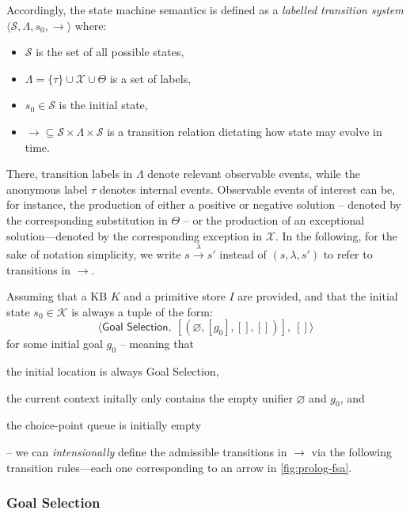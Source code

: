 \documentclass{article}
\newenvironment{inlinelist}{\begin{enumerate*}[label=\emph{(\roman*)}]}{\end{enumerate*}}
\newcommand{\stateStyle}[1]{\textsf{#1}}
\newcommand{\state}[1]{\stateStyle{#1}}
\newcommand{\notableset}[1]{\mathcal{#1}}
\newcommand{\transition}[1]{\xrightarrow{\ #1\ }}
\begin{document}
Accordingly, the state machine semantics is defined as a \emph{labelled transition system} $\langle \notableset{S}, \Lambda, s_0, \longrightarrow \rangle$ where:
%
\begin{itemize}
    \item $\notableset{S}$ is the set of all possible states,
    \item $\Lambda = \{ \tau \} \cup \notableset{X} \cup \Theta $ is a set of labels,
    \item $s_0 \in \notableset{S}$ is the initial state,
    \item $\longrightarrow \subseteq \notableset{S} \times \Lambda \times \notableset{S}$ is a transition relation dictating how state may evolve in time.
\end{itemize}
%
There, transition labels in $\Lambda$ denote relevant observable events, while the anonymous label $\tau$ denotes internal events.
%
Observable events of interest can be, for instance, the production of either a positive or negative solution -- denoted by the corresponding substitution in $\Theta$ -- or the production of an exceptional solution---denoted by the corresponding exception in $\notableset{X}$.
%
In the following, for the sake of notation simplicity, we write $s \transition{\lambda} s'$ instead of $(s, \lambda, s')$ to refer to transitions in $\longrightarrow$.

Assuming that a KB $K$ and a primitive store $I$ are provided, and that the initial state $s_0 \in \notableset{K}$ is always a tuple of the form:
%
\[ \langle \state{Goal Selection},\   [( \varnothing, [g_0], [], [] )],\  [] \rangle \]
%
for some initial goal $g_0$ -- meaning that
%
\begin{inlinelist}
    \item the initial location is always \state{Goal Selection},
    \item the current context initally only contains the empty unifier $\varnothing$ and $g_0$, and
    \item the choice-point queue is initially empty
\end{inlinelist}
%
-- we can \emph{intensionally} define the admissible transitions in $\longrightarrow$ via the following transition rules---each one corresponding to an arrow in \cref{fig:prolog-fsa}.

\subsubsection{Goal Selection}
\end{document}

